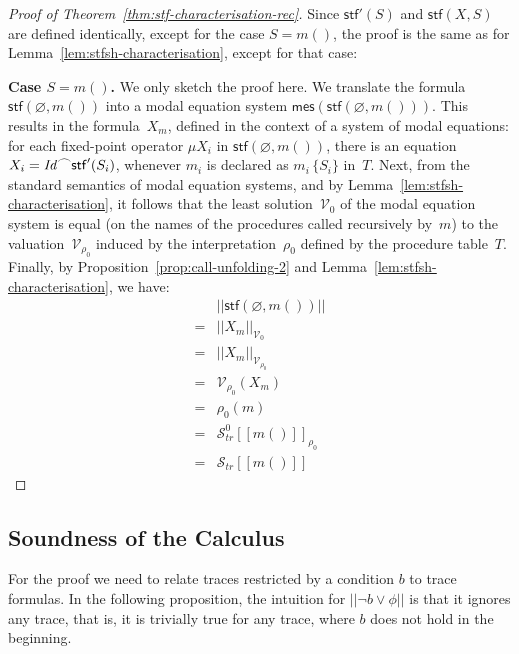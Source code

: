 \documentclass[10pt,a4paper]{amsart}
\theoremstyle{definition}
\newcommand{\dg}[1]{\marginpar{DG: #1}}
\newcommand{\denot}[1]{\left[\!\left[#1\right]\!\right]}
\newcommand{\fdenot}[1]{\left|\!\left|#1\right|\!\right|}
\newcommand{\trcdenot}[1]{\mathcal{S}_{\mathit{tr}}\!\denot{#1}}
\newcommand{\trcdenoth}[1]{\mathcal{S}^0_{\mathit{tr}}\!\denot{#1}}
\newcommand{\logdenotV}[2]{\left|\!\left|#1\right|\!\right|_{#2}}
\newcommand{\chop}[0]{\raisebox{1ex}{$\frown$}}
\newcommand{\mes}[1]{\mathsf{mes} (#1)}
\newcommand{\stfsh}[1]{\mathsf{stf}' (#1)}
\newcommand{\stfh}[2]{\mathsf{stf}(#1, #2)}
\begin{document}
\begin{proof}[Proof of Theorem~\ref{thm:stf-characterisation-rec}]
  Since $\stfsh{S}$ and $\stfh{X}{S}$ are defined identically, except
  for the case $S=m()$, the proof is the same as for
  Lemma~\ref{lem:stfsh-characterisation}, except for that case:
  
  \noindent\textbf{Case $S = m()$.} 
  We only sketch the proof here. 
  We translate the formula $\stfh{\varnothing}{m()}$ into a modal
  equation system $\mes{\stfh{\varnothing}{m()}}$.
  This results in the formula~$X_m$, defined in the context of a
  system of modal equations: for each fixed-point operator $\mu X_i$
  in $\stfh{\varnothing}{m()}$, there is an equation
  $X_i = \mathit{Id} \chop \stfsh{S_i}$, whenever $m_i$ is declared as
  $m_i\, \{S_i\}$ in~$T$.
  Next, from the standard semantics of modal equation systems,
  and by Lemma~\ref{lem:stfsh-characterisation}, it follows that the
  least solution~$\mathcal{V}_0$ of the modal equation system is equal
  (on the names of the procedures called recursively by~$m$) to the
  valuation~$\mathcal{V}_{\rho_0}$ induced by the
  interpretation~$\rho_0$ defined by the procedure table~$T$.
  Finally, by Proposition~\ref{prop:call-unfolding-2} and
  Lemma~\ref{lem:stfsh-characterisation}, we have:
  \[
    \begin{array}{cl}
      & \fdenot{\stfh{\varnothing}{m()}} \\
      = & \logdenotV{X_m}{\mathcal{V}_0} \\
      = & \logdenotV{X_m}{\mathcal{V}_{\rho_0}} \\
      = & \mathcal{V}_{\rho_0} (X_m) \\
      = & \rho_0 (m) \\
      = & \trcdenoth{m()}_{\rho_0}  \\
      = & \trcdenot{m()}
    \end{array}
  \]
\end{proof}

\subsection{Soundness of the Calculus}
\label{sec:soundness-app}

For the proof we need to relate traces restricted by a condition $b$
to trace formulas. In the following proposition, the intuition for
$\fdenot{\lnot b\lor\phi}$ is that it ignores any trace, that is, it
is trivially true for any trace, where $b$ does not hold in the
beginning.
\end{document}
